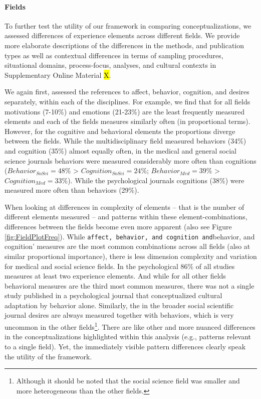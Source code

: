 \paragraph{Fields}

To further test the utility of our framework in comparing
conceptualizations, we assessed differences of experience elements
across different fields. We provide more elaborate descriptions of the
differences in the methods, and publication types as well as contextual
differences in terms of sampling procedures, situational domains,
process-focus, analyses, and cultural contexts in Supplementary Online
Material \hl{X}.

We again first, assessed the references to affect, behavior, cognition,
and desires separately, within each of the disciplines. For example, we
find that for all fields motivations (7-10\%) and emotions (21-23\%) are
the least frequently measured elements and each of the fields measures
similarly often (in proportional terms). However, for the cognitive and
behavioral elements the proportions diverge between the fields. While
the multidisciplinary field measured behaviors (34\%) and cognition
(35\%) almost equally often, in the medical and general social science
journals behaviors were measured considerably more often than cognitions
(\(Behavior_{SoSci} = 48\%\) \textgreater{}
\(Cognition_{SoSci} = 24\%\); \(Behavior_{Med} = 39\%\) \textgreater{}
\(Cognition_{Med} = 33\%\)). While the psychological journals cognitions
(38\%) were measured more often than behaviors (29\%).

When looking at differences in complexity of elements -- that is the
number of different elements measured -- and patterns within these
element-combinations, differences between the fields become even more
apparent (also see Figure \ref{fig:FieldPlotFreq}). While
\texttt{affect,\ behavior,\ and\ cognition\textquotesingle{}\ and}behavior,
and cognition' measures are the most common combinations across all
fields (also at similar proportional importance), there is less
dimension complexity and variation for medical and social science
fields. In the psychological 86\% of all studies measures at least two
experience elements. And while for all other fields behavioral measures
are the third most common measures, there was not a single study
published in a psychological journal that conceptualized cultural
adaptation by behavior alone. Similarly, the in the broader social
scientific journal desires are always measured together with behaviors,
which is very uncommon in the other
fields\footnote{Although it should be noted that the social science field was smaller and more heterogeneous than the other fields.}.
There are like other and more nuanced differences in the
conceptualizations highlighted within this analysis (e.g., patterns
relevant to a single field). Yet, the immediately visible pattern
differences clearly speak the utility of the framework.

